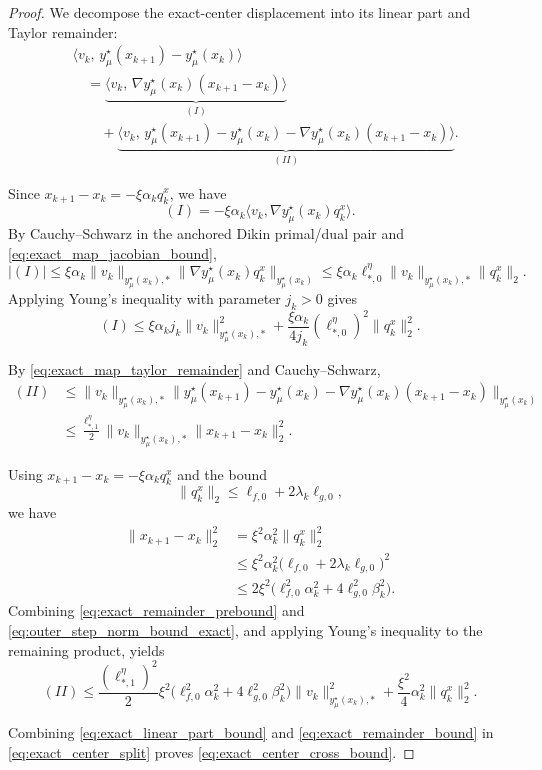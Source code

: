 \documentclass{article}
\begin{document}
\begin{proof}
We decompose the exact-center displacement into its linear part and Taylor remainder:
\begin{align}
&\big\langle v_k,\,
y_\mu^\star(x_{k+1})-y_\mu^\star(x_k)
\big\rangle
\nonumber\\
&\quad=
\underbrace{
\big\langle v_k,\,
\nabla y_\mu^\star(x_k)(x_{k+1}-x_k)
\big\rangle
}_{(I)}
\nonumber\\
&\qquad+
\underbrace{
\Big\langle v_k,\,
y_\mu^\star(x_{k+1})-y_\mu^\star(x_k)
-\nabla y_\mu^\star(x_k)(x_{k+1}-x_k)
\Big\rangle
}_{(II)} .
\label{eq:exact_center_split}
\end{align}

Since \(x_{k+1}-x_k=-\xi\alpha_k q_k^x\), we have
\[
(I)
=
-\xi\alpha_k
\big\langle v_k,\nabla y_\mu^\star(x_k)q_k^x\big\rangle .
\]
By Cauchy--Schwarz in the anchored Dikin primal/dual pair and
\eqref{eq:exact_map_jacobian_bound},
\[
|(I)|
\le
\xi\alpha_k
\|v_k\|_{y_\mu^\star(x_k),*}
\|\nabla y_\mu^\star(x_k)q_k^x\|_{y_\mu^\star(x_k)}
\le
\xi\alpha_k
\ell_{*,0}^\eta
\|v_k\|_{y_\mu^\star(x_k),*}
\|q_k^x\|_2 .
\]
Applying Young's inequality with parameter \(j_k>0\) gives
\begin{equation}
\label{eq:exact_linear_part_bound}
(I)
\le
\xi\alpha_k j_k\|v_k\|_{y_\mu^\star(x_k),*}^2
+
\frac{\xi\alpha_k}{4j_k}(\ell_{*,0}^\eta)^2\|q_k^x\|_2^2 .
\end{equation}

By \eqref{eq:exact_map_taylor_remainder} and Cauchy--Schwarz,
\begin{align}
(II)
&\le
\|v_k\|_{y_\mu^\star(x_k),*}
\Big\|
y_\mu^\star(x_{k+1})-y_\mu^\star(x_k)
-\nabla y_\mu^\star(x_k)(x_{k+1}-x_k)
\Big\|_{y_\mu^\star(x_k)}
\nonumber\\
&\le
\frac{\ell_{*,1}^\eta}{2}
\|v_k\|_{y_\mu^\star(x_k),*}
\|x_{k+1}-x_k\|_2^2 .
\label{eq:exact_remainder_prebound}
\end{align}

Using \(x_{k+1}-x_k=-\xi\alpha_k q_k^x\) and the bound
\[
\|q_k^x\|_2
\le
\ell_{f,0}+2\lambda_k\ell_{g,0},
\]
we have
\begin{align}
\|x_{k+1}-x_k\|_2^2
&=
\xi^2\alpha_k^2\|q_k^x\|_2^2
\nonumber\\
&\le
\xi^2\alpha_k^2
\bigl(\ell_{f,0}+2\lambda_k\ell_{g,0}\bigr)^2
\nonumber\\
&\le
2\xi^2
\bigl(\ell_{f,0}^2\alpha_k^2+4\ell_{g,0}^2\beta_k^2\bigr).
\label{eq:outer_step_norm_bound_exact}
\end{align}
Combining \eqref{eq:exact_remainder_prebound} and
\eqref{eq:outer_step_norm_bound_exact}, and applying Young's inequality to the remaining product,
yields
\begin{equation}
\label{eq:exact_remainder_bound}
(II)
\le
\frac{(\ell_{*,1}^\eta)^2}{2}\xi^2
\bigl(\ell_{f,0}^2\alpha_k^2+4\ell_{g,0}^2\beta_k^2\bigr)
\|v_k\|_{y_\mu^\star(x_k),*}^2
+
\frac{\xi^2}{4}\alpha_k^2\|q_k^x\|_2^2 .
\end{equation}

Combining \eqref{eq:exact_linear_part_bound} and \eqref{eq:exact_remainder_bound} in
\eqref{eq:exact_center_split} proves \eqref{eq:exact_center_cross_bound}.
\end{proof}
\end{document}
